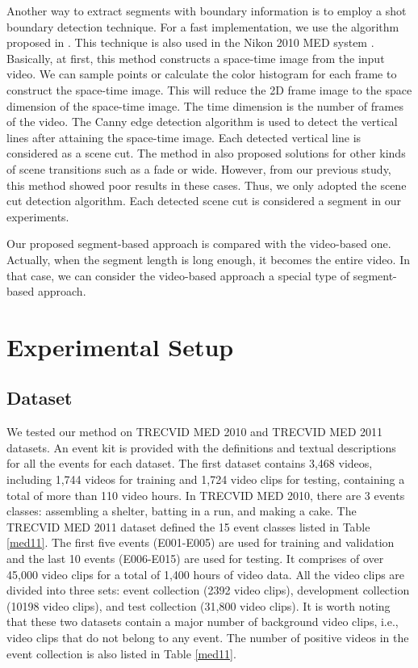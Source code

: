 Another way to extract segments with boundary information is to employ a shot boundary detection technique. For a fast implementation, we use the algorithm proposed in \cite{Guimaraes:2003}. This technique is also used in the Nikon 2010 MED system \cite{DBLP:conf/trecvid/MatsuoN10}. Basically, at first, this method constructs a space-time image from the input video. We can sample points or calculate the color histogram for each frame to construct the space-time image. This will reduce the 2D frame image to the space dimension of the space-time image. The time dimension is the number of frames of the video. The Canny edge detection algorithm is used to detect the vertical lines after attaining the space-time image. Each detected vertical line is considered as a scene cut. The method in \cite{Guimaraes:2003} also proposed solutions for other kinds of scene transitions such as a fade or wide. However, from our previous study, this method showed poor results in these cases. Thus, we only adopted the scene cut detection algorithm. Each detected scene cut is considered a segment in our experiments.

Our proposed segment-based approach is compared with the video-based one. Actually, when the segment length is long enough, it becomes the entire video. In that case, we can consider the video-based approach a special type of segment-based approach.
\section{Experimental Setup}
\label{experimentalsetup}
\subsection{Dataset}
\label{experimentalsetup:1}
We tested our method on TRECVID MED 2010 and TRECVID MED 2011 datasets. An event kit is provided with the definitions and textual descriptions for all the events for each dataset. The first dataset contains 3,468 videos, including 1,744 videos for training and 1,724 video clips for testing, containing a total of more than 110 video hours. In TRECVID MED 2010, there are 3 events classes: assembling a shelter, batting in a run, and making a cake. The TRECVID MED 2011 dataset defined the 15 event classes listed in Table \ref{med11}. The first five events (E001-E005) are used for training and validation and the last 10 events (E006-E015) are used for testing. It comprises of over 45,000 video clips for a total of 1,400 hours of video data. All the video clips are divided into three sets: event collection (2392 video clips), development collection (10198 video clips), and test collection (31,800 video clips). It is worth noting that these two datasets contain a major number of background video clips, i.e., video clips that do not belong to any event. The number of positive videos in the event collection is also listed in Table \ref{med11}.

